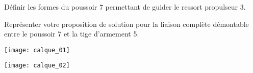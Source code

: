 \documentclass[11pt]{article}
\begin{document}
\UPSTIquestion Définir les formes du poussoir 7 permettant de guider le ressort propulseur 3.

 Représenter votre proposition de solution pour la liaison complète démontable entre le poussoir 7 et la tige d'armement 5. 
\begin{UPSTIcorrige}
\end{UPSTIcorrige}


\begin{center}
\texttt{[image: calque\_01]}
\end{center}

\begin{center}
\texttt{[image: calque\_02]}
\end{center}

%

\end{document}
